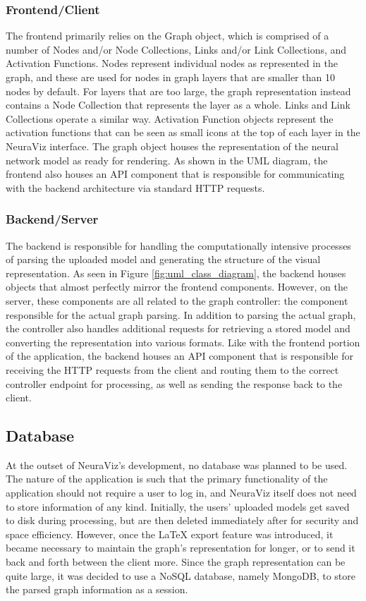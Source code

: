 \subsubsection{Frontend/Client}
The frontend primarily relies on the Graph object, which is comprised of a number of Nodes and/or Node Collections, Links and/or Link Collections, and Activation Functions. Nodes represent individual nodes as represented in the graph, and these are used for nodes in graph layers that are smaller than 10 nodes by default. For layers that are too large, the graph representation instead contains a Node Collection that represents the layer as a whole. Links and Link Collections operate a similar way. Activation Function objects represent the activation functions that can be seen as small icons at the top of each layer in the NeuraViz interface. The graph object houses the representation of the neural network model as ready for rendering. As shown in the UML diagram, the frontend also houses an API component that is responsible for communicating with the backend architecture via standard HTTP requests.

\subsubsection{Backend/Server}
The backend is responsible for handling the computationally intensive processes of parsing the uploaded model and generating the structure of the visual representation. As seen in Figure \ref{fig:uml_class_diagram}, the backend houses objects that almost perfectly mirror the frontend components. However, on the server, these components are all related to the graph controller: the component responsible for the actual graph parsing. In addition to parsing the actual graph, the controller also handles additional requests for retrieving a stored model and converting the representation into various formats. Like with the frontend portion of the application, the backend houses an API component that is responsible for receiving the HTTP requests from the client and routing them to the correct controller endpoint for processing, as well as sending the response back to the client.

\subsection{Database}
At the outset of NeuraViz's development, no database was planned to be used. The nature of the application is such that the primary functionality of the application should not require a user to log in, and NeuraViz itself does not need to store information of any kind. Initially, the users' uploaded models get saved to disk during processing, but are then deleted immediately after for security and space efficiency. However, once the LaTeX export feature was introduced, it became necessary to maintain the graph's representation for longer, or to send it back and forth between the client more. Since the graph representation can be quite large, it was decided to use a NoSQL database, namely MongoDB, to store the parsed graph information as a session.

